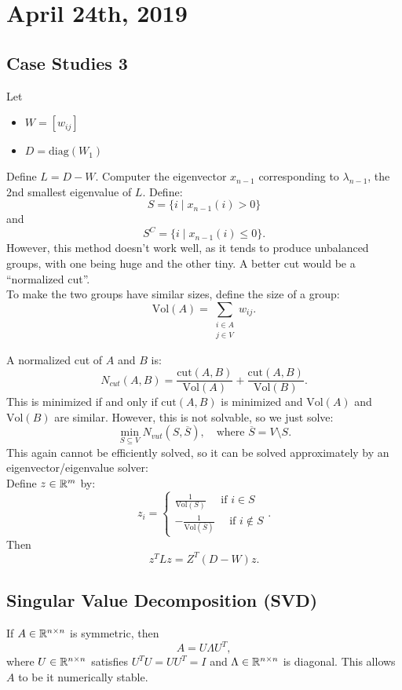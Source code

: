 \documentclass[../main/main.tex]{subfiles}
\begin{document}
\section{April 24th, 2019}
\subsection{Case Studies 3}
Let
\begin{itemize}
	\item $W=[w_{ij}]$ 
	\item $D=\text{diag}(W_1)$
\end{itemize}
Define $L=D-W$. Computer the eigenvector $x_{n-1}$ corresponding to $\lambda_{n-1}$, the 2nd smallest eigenvalue of $L$. Define: \[
	S=\{i\mid x_{n-1}(i)>0\} 
\] and \[
S^C= \{i\mid x_{n-1}(i)\le 0\} 
.\]  However, this method doesn't work well, as it tends to produce unbalanced groups, with one being huge and the other tiny. A better cut would be a ``normalized cut''. \\

To make the two groups have similar sizes, define the size of a group: \[
	\text{Vol}(A)=\sum\limits_{\substack{i\in A\\j\in V}}w_{ij}
.\] 
\begin{definition}
	A normalized cut of $A$ and $B$ is: \[
		N_{cut}(A,B)= \frac{\text{cut}(A,B)}{\text{Vol}(A)}+\frac{\text{cut}(A,B)}{\text{Vol}(B)}
	.\] This is minimized if and only if $\text{cut}(A,B)$ is minimized and $\text{Vol}(A)$ and $\text{Vol}(B)$ are similar. However, this is not solvable, so we just solve: \[
	\min_{S\subseteq V}N_{vut}(S,\overline{S}), \quad\text{where $\overline{S}=V\setminus S$}
	.\] This again cannot be efficiently solved, so it can be solved approximately by an eigenvector/eigenvalue solver:\\

	Define $z\in \mathbb{R}^{m}$ by:
	\[
	z_i=\begin{cases}
		\frac{1}{\text{Vol}(S)}\quad \text{ if $i\in S$}\\
	-\frac{1}{\text{Vol}(\overline{S})}\quad\text{ if $i\not\in S$}	\end{cases}
	.\] Then \[
	z^{T}Lz=Z^{T}(D-W)z
	.\] 
\end{definition}
\subsection{Singular Value Decomposition (SVD)}
If $A\in \mathbb{R}^{n\times n}$ is symmetric, then  \[
A=U\Lambda U^T
,\] where $U\in \mathbb{R}^{n\times n}$ satisfies $U^{T}U=U U^{T}=I$ and $\Lambda\in \mathbb{R}^{n\times n}$ is diagonal. This allows $A$ to be it numerically stable.\\
\end{document}

